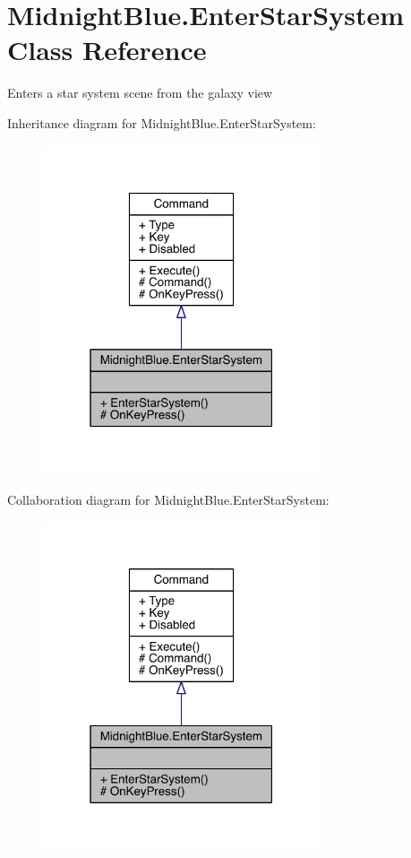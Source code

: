 \hypertarget{class_midnight_blue_1_1_enter_star_system}{}\section{Midnight\+Blue.\+Enter\+Star\+System Class Reference}
\label{class_midnight_blue_1_1_enter_star_system}


Enters a star system scene from the galaxy view  




Inheritance diagram for Midnight\+Blue.\+Enter\+Star\+System\+:\nopagebreak
\begin{figure}[H]
\begin{center}
\leavevmode
\includegraphics[width=232pt]{class_midnight_blue_1_1_enter_star_system__inherit__graph}
\end{center}
\end{figure}


Collaboration diagram for Midnight\+Blue.\+Enter\+Star\+System\+:\nopagebreak
\begin{figure}[H]
\begin{center}
\leavevmode
\includegraphics[width=232pt]{class_midnight_blue_1_1_enter_star_system__coll__graph}
\end{center}
\end{figure}
